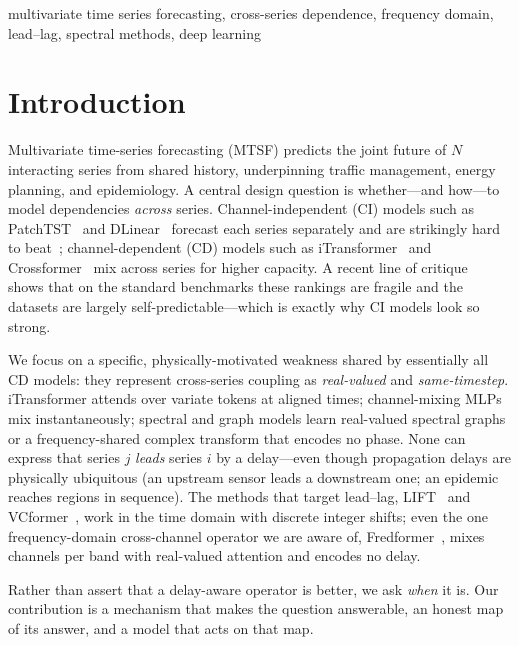 \documentclass[journal,a4paper]{IEEEtran}
\begin{document}
\begin{IEEEkeywords}
multivariate time series forecasting, cross-series dependence, frequency domain, lead--lag,
spectral methods, deep learning
\end{IEEEkeywords}

\section{Introduction}
\label{sec:intro}
Multivariate time-series forecasting (MTSF) predicts the joint future of $N$ interacting series
from shared history, underpinning traffic management, energy planning, and epidemiology. A central
design question is whether---and how---to model dependencies \emph{across} series.
Channel-independent (CI) models such as PatchTST~\citep{nie2023patchtst} and
DLinear~\citep{zeng2023dlinear} forecast each series separately and are strikingly hard to
beat~\citep{han2024capacity}; channel-dependent (CD) models such as
iTransformer~\citep{liu2024itransformer} and Crossformer~\citep{zhang2023crossformer} mix across
series for higher capacity. A recent line of critique~\citep{brigato2025champions,abdelmalak2025biased}
shows that on the standard benchmarks these rankings are fragile and the datasets are largely
self-predictable---which is exactly why CI models look so strong.

We focus on a specific, physically-motivated weakness shared by essentially all CD models: they
represent cross-series coupling as \emph{real-valued} and \emph{same-timestep}. iTransformer
attends over variate tokens at aligned times; channel-mixing MLPs mix instantaneously; spectral
and graph models learn real-valued spectral graphs or a frequency-shared complex transform that
encodes no phase. None can express that series $j$ \emph{leads} series $i$ by a delay---even though
propagation delays are physically ubiquitous (an upstream sensor leads a downstream one; an
epidemic reaches regions in sequence). The methods that target lead--lag, LIFT~\citep{zhao2024lift}
and VCformer~\citep{yang2024vcformer}, work in the time domain with discrete integer shifts; even
the one frequency-domain cross-channel operator we are aware of, Fredformer~\citep{piao2024fredformer},
mixes channels per band with real-valued attention and encodes no delay.

Rather than assert that a delay-aware operator is better, we ask \emph{when} it is. Our
contribution is a mechanism that makes the question answerable, an honest map of its answer, and a
model that acts on that map.
\end{document}
